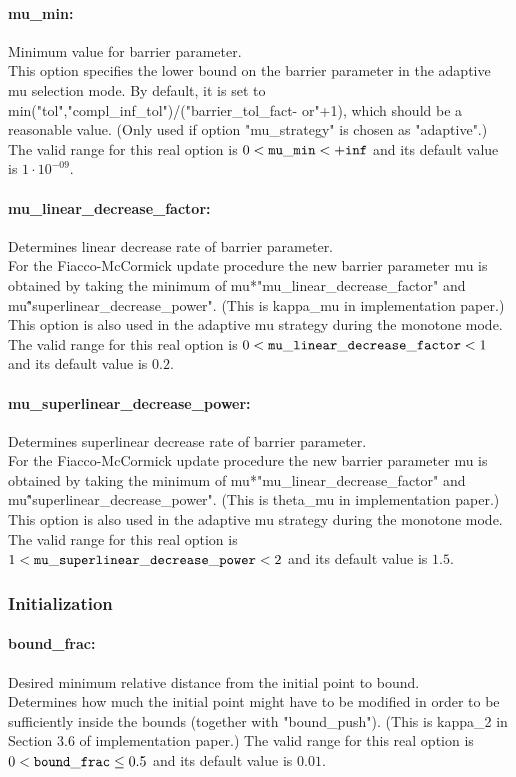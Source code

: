 \paragraph{mu\_min:} Minimum value for barrier parameter. $\;$ \\
 This option specifies the lower bound on the
barrier parameter in the adaptive mu selection
mode. By default, it is set to
min("tol","compl\_inf\_tol")/("barrier\_tol\_fact-
or"+1), which should be a reasonable value. (Only
used if option "mu\_strategy" is chosen as
"adaptive".) The valid range for this real option is 
$0 <  {\tt mu\_min } <  {\tt +inf}$
and its default value is $1 \cdot 10^{-09}$.


\paragraph{mu\_linear\_decrease\_factor:} Determines linear decrease rate of barrier parameter. $\;$ \\
 For the Fiacco-McCormick update procedure the new
barrier parameter mu is obtained by taking the
minimum of mu*"mu\_linear\_decrease\_factor" and
mu\^"superlinear\_decrease\_power".  (This is
kappa\_mu in implementation paper.) This option
is also used in the adaptive mu strategy during
the monotone mode. The valid range for this real option is 
$0 <  {\tt mu\_linear\_decrease\_factor } <  1$
and its default value is $0.2$.


\paragraph{mu\_superlinear\_decrease\_power:} Determines superlinear decrease rate of barrier parameter. $\;$ \\
 For the Fiacco-McCormick update procedure the new
barrier parameter mu is obtained by taking the
minimum of mu*"mu\_linear\_decrease\_factor" and
mu\^"superlinear\_decrease\_power".  (This is
theta\_mu in implementation paper.) This option
is also used in the adaptive mu strategy during
the monotone mode. The valid range for this real option is 
$1 <  {\tt mu\_superlinear\_decrease\_power } <  2$
and its default value is $1.5$.

\subsubsection{Initialization}

\paragraph{bound\_frac:} Desired minimum relative distance from the initial point to bound. $\;$ \\
 Determines how much the initial point might have
to be modified in order to be sufficiently inside
the bounds (together with "bound\_push").  (This
is kappa\_2 in Section 3.6 of implementation
paper.) The valid range for this real option is 
$0 <  {\tt bound\_frac } \le 0.5$
and its default value is $0.01$.


